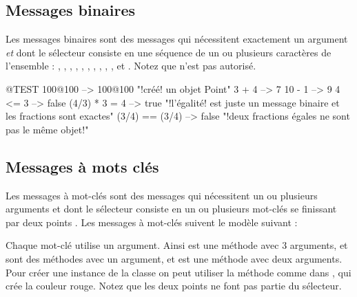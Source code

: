 \documentclass[a4paper,10pt,twoside]{book}
\begin{document}
\subsection{Messages binaires} 
Les messages binaires sont des messages qui n\'ecessitent exactement un argument \emph{et} dont le s\'electeur consiste en une s\'equence de un ou plusieurs caract\`eres de l'ensemble : \ct{+}, \ct{-}, \ct{*}, \ct{/}, \ct{&}, \ct{=}, \ct{>}, \ct{|}, \ct{<}, \ct{~}, et . Notez que \ct{--} n'est pas autoris\'e.

\begin{code}{@TEST}
100@100      --> 100@100  "!cr\'e\'e! un objet Point"
3 + 4              --> 7
10 - 1            --> 9
4 <= 3            --> false
(4/3) * 3 = 4   --> true  "!l'\'egalit\'e! est juste un message binaire et les fractions sont exactes"
(3/4) == (3/4) --> false  "!deux fractions \'egales ne sont pas le m\^eme objet!"
\end{code}


\subsection{Messages \`a mots cl\'es}

Les messages \`a mot-cl\'es sont des messages qui n\'ecessitent un ou plusieurs arguments et dont le s\'electeur consiste en un ou plusieurs mot-cl\'es se finissant par deux points \ct{:}.  Les messages \`a mot-cl\'es suivent le mod\`ele suivant : 

Chaque mot-cl\'e utilise un argument. Ainsi  est une m\'ethode avec 3 arguments,  et  sont des m\'ethodes avec un argument, et  est une m\'ethode avec deux arguments. Pour cr\'eer une instance de la classe  on peut utiliser la m\'ethode  comme dans , qui cr\'ee la couleur rouge. Notez que les deux points ne font pas partie du s\'electeur.
\end{document}
